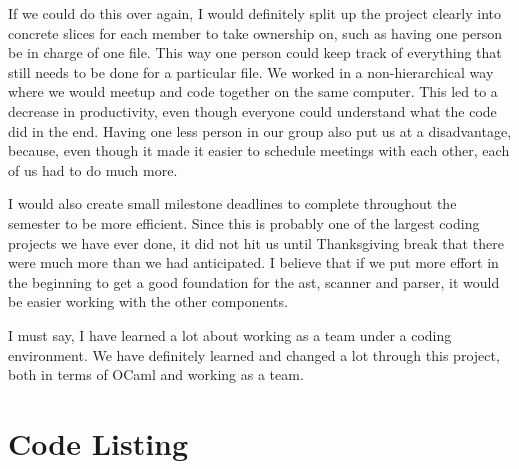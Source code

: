 \documentclass[11pt]{report}
\begin{document}
If we could do this over again, I would definitely split up the project clearly into concrete slices for each member to take ownership on, such as having one person be in charge of one file. This way one person could keep track of everything that still needs to be done for a particular file. We worked in a non-hierarchical way where we would meetup and code together on the same computer. This led to a decrease in productivity, even though everyone could understand what the code did in the end. Having one less person in our group also put us at a disadvantage, because, even though it made it easier to schedule meetings with each other, each of us had to do much more.

I would also create small milestone deadlines to complete throughout the semester to be more efficient. Since this is probably one of the largest coding projects we have ever done, it did not hit us until Thanksgiving break that there were much more than we had anticipated. I believe that if we put more effort in the beginning to get a good foundation for the ast, scanner and parser, it would be easier working with the other components.

I must say, I have learned a lot about working as a team under a coding environment. We have definitely learned and changed a lot through this project, both in terms of OCaml and working as a team.

\appendix
\chapter{Code Listing}

















\end{document}
